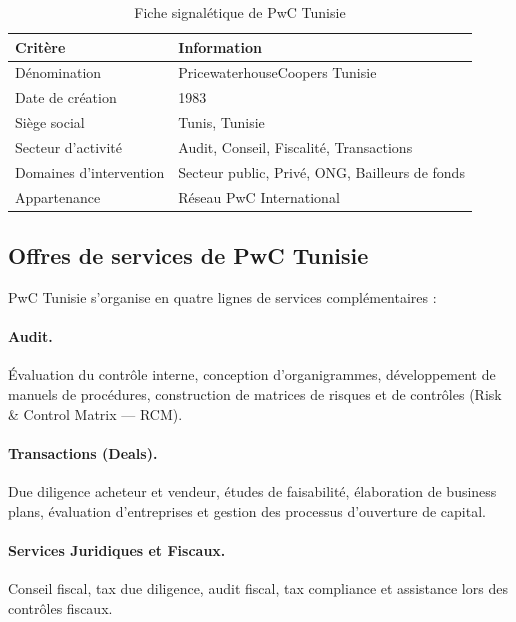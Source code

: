 \begin{table}[H]
\centering
\caption{Fiche signalétique de PwC Tunisie}
\label{tab:fiche_pwc_tunisie}
\begin{tabular}{ll}
\toprule
\textbf{Critère}              & \textbf{Information} \\
\midrule
Dénomination                  & PricewaterhouseCoopers Tunisie \\
Date de création              & 1983 \\
Siège social                  & Tunis, Tunisie \\
Secteur d'activité            & Audit, Conseil, Fiscalité, Transactions \\
Domaines d'intervention       & Secteur public, Privé, ONG, Bailleurs de fonds \\
Appartenance                  & Réseau PwC International \\
\bottomrule
\end{tabular}
\end{table}

\subsection{Offres de services de PwC Tunisie}

PwC Tunisie s'organise en quatre lignes de services complémentaires :

\paragraph{Audit.}
Évaluation du contrôle interne, conception d'organigrammes, développement de manuels de
procédures, construction de matrices de risques et de contrôles (Risk \& Control
Matrix --- RCM).

\paragraph{Transactions (Deals).}
Due diligence acheteur et vendeur, études de faisabilité, élaboration de business plans,
évaluation d'entreprises et gestion des processus d'ouverture de capital.

\paragraph{Services Juridiques et Fiscaux.}
Conseil fiscal, tax due diligence, audit fiscal, tax compliance et assistance lors des
contrôles fiscaux.


